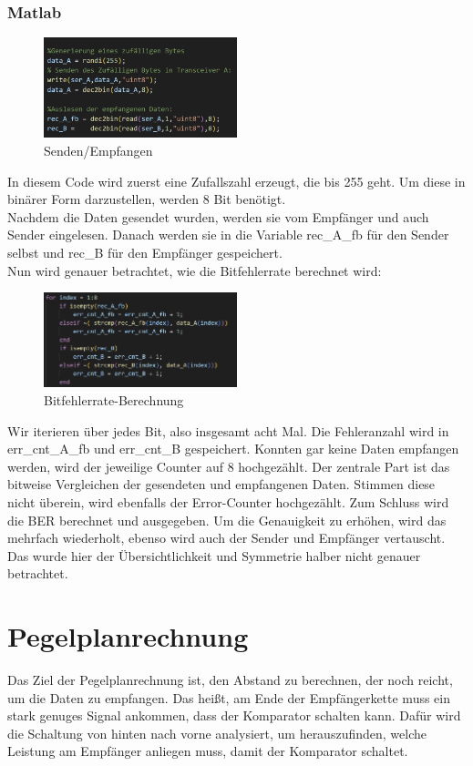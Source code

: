 \subsubsection{Matlab}
\begin{figure}[H]
    \centering
    \includegraphics[width=0.5\textwidth]{Pictures/einlesenMatlab.png}
    \caption{Senden/Empfangen}
    \label{fig:matlab_example}
\end{figure}
In diesem Code wird zuerst eine Zufallszahl erzeugt, die bis 255 geht.
Um diese in binärer Form darzustellen, werden 8 Bit benötigt.
\\
Nachdem die Daten gesendet wurden, werden sie vom Empfänger und auch Sender eingelesen.
Danach werden sie in die Variable rec\_A\_fb für den Sender selbst und rec\_B für den Empfänger gespeichert.
\\
Nun wird genauer betrachtet, wie die Bitfehlerrate berechnet wird:
\begin{figure}[H]
    \centering
    \includegraphics[width=0.5\textwidth]{Pictures/vergleich.png}
    \caption{Bitfehlerrate-Berechnung}
    \label{fig:bitfehler}
\end{figure}
Wir iterieren über jedes Bit, also insgesamt acht Mal.
Die Fehleranzahl wird in err\_cnt\_A\_fb und err\_cnt\_B gespeichert.
Konnten gar keine Daten empfangen werden, wird der jeweilige Counter auf 8 hochgezählt.
Der zentrale Part ist das bitweise Vergleichen der gesendeten und empfangenen Daten.
Stimmen diese nicht überein, wird ebenfalls der Error-Counter hochgezählt.
Zum Schluss wird die BER berechnet und ausgegeben.
Um die Genauigkeit zu erhöhen, wird das mehrfach wiederholt, ebenso wird auch der Sender und Empfänger vertauscht.
Das wurde hier der Übersichtlichkeit und Symmetrie halber nicht genauer betrachtet.

\section{Pegelplanrechnung}
Das Ziel der Pegelplanrechnung ist, den Abstand zu berechnen, der noch reicht, um die Daten zu empfangen.
Das heißt, am Ende der Empfängerkette muss ein stark genuges Signal ankommen, dass der Komparator schalten kann.
Dafür wird die Schaltung von hinten nach vorne analysiert, um herauszufinden, welche Leistung am Empfänger anliegen muss, damit der Komparator schaltet.

